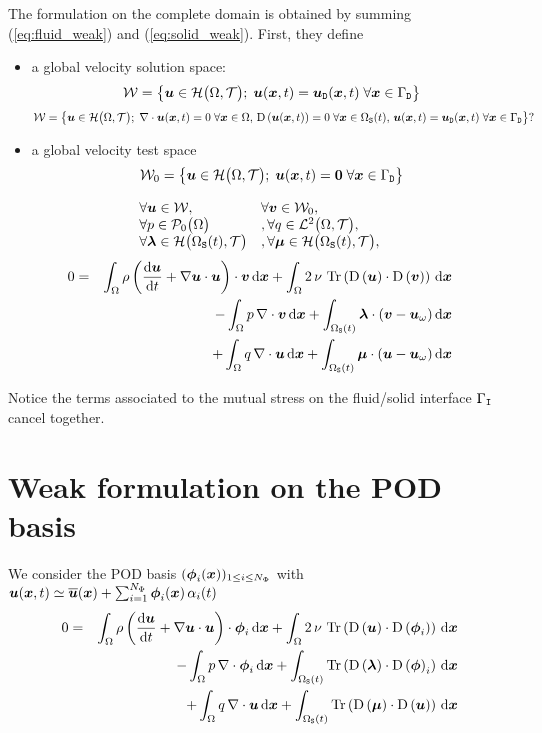 \documentclass[10pt,a4paper]{article}
\begin{document}
The formulation on the complete domain is obtained by summing (\ref{eq:fluid_weak}) and (\ref{eq:solid_weak}). First, they define
\begin{itemize}
\item a global velocity solution space: 
$$\sW = \left\{\vu \in \sH\big(\dom, \sT\big);\;\vu(\vx, t) = \vud(\vx, t)\; \forall \vx \in \boud \right\}$$
$$\sW = \left\{\vu \in \sH\big(\dom, \sT\big);\;\div \vu(\vx, t)=0\; \forall \vx \in \dom,\,\D{\vu(\vx, t)}=0\; \forall \vx \in \doms(t),\,\vu(\vx, t) = \vud(\vx, t)\; \forall \vx \in \boud \right\}?$$
\item a global velocity test space 
$$\sW_0 = \left\{\vu \in \sH\big(\dom, \sT\big);\;\vu(\vx, t) = \vec 0 \; \forall \vx \in \boud \right\}$$
\end{itemize}
$$
\begin{array}{ll}
\forall \vu \in \sW, & \forall \vv \in \sW_0, \\
\forall p \in \sP_0\big(\dom\big) &,  \forall q \in \sL^2\big(\dom, \sT\big), \\
\forall \vlambda \in \sH\big(\doms(t),\sT\big)&,  \forall \vmu \in \sH\big(\doms(t),\sT\big), \\
\end{array}
$$
\begin{eqnarray}
\nonumber 0 &=& 
\int_{\dom}\rho\left(\dt \vu + \grad \vu \cdot \vu\right)\cdot\vv \,\d\vx + \int_{\dom}2\,\nu\,\trace{\D{\vu}\cdot\D{\vv}} \, \d\vx\\
\nonumber & & - \int_{\dom} p\,\div \vv \,\d\vx + \int_{\doms(t)} \vlambda \cdot (\vv-\vuo) \, \d \vx \\
\label{eq:solid_weak} & & + \int_{\dom} q\,\div \vu \,\d\vx + \int_{\doms(t)}\vmu \cdot (\vu-\vuo)\,\d \vx
\end{eqnarray}
%

Notice the terms associated to the mutual stress on the fluid/solid interface $\boui$ cancel together.
%

\section{Weak formulation on the POD basis}
We consider the POD basis $(\vphi_i(\vx))_{1 \leq i \leq N_\Phi}$ with $\vu(\vx, t)\simeq \bu(\vx) + \sum_{i=1}^{N_\Phi}\vphi_i(\vx)\,\alpha_i(t)$
\begin{eqnarray}
\nonumber 0 &=& 
\int_{\dom}\rho\left(\dt \vu + \grad \vu \cdot \vu\right)\cdot\vphi_i \,\d\vx + \int_{\dom}2\,\nu\,\trace{\D{\vu}\cdot\D{\vphi_i}} \, \d\vx\\
\nonumber & & - \int_{\dom} p\,\div \vphi_i \,\d\vx + \int_{\doms(t)}\trace{\D\vlambda \cdot \D \vphi_i }\, \d \vx \\
\label{eq:solid_weak} & & + \int_{\dom} q\,\div \vu \,\d\vx + \int_{\doms(t)}\trace{\D\vmu \cdot\D \vu}\,\d \vx
\end{eqnarray}
\end{document}
